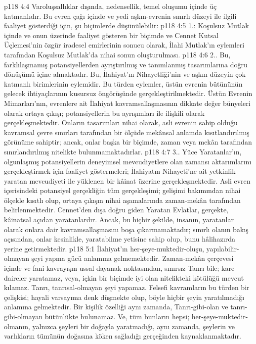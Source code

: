 \vs p118 4:4 Varoluşsallıklar dışında, nedensellik, temel oluşumu içinde üç katmanlıdır. Bu evren çağı içinde ve yedi aşkın\hyp{}evrenin sınırlı düzeyi ile ilgili faaliyet gösterdiği için, şu biçimlerde düşünülebilir:
\vs p118 4:5 1.\bibnobreakspace {}: Koşulsuz Mutlak içinde ve onun üzerinde faaliyet gösteren bir biçimde ve Cennet Kutsal Üçlemesi’nin özgür iradesel emirlerinin sonucu olarak, İlahi Mutlak’ın eylemleri tarafından Koşulsuz Mutlak’da nihai sonun oluşturulması.
\vs p118 4:6 2.\bibnobreakspace {}. Bu, farklılaşmamış potansiyellerden ayrıştırılmış ve tanımlanmış tasarımlarına doğru dönüşümü içine almaktadır. Bu, İlahiyat’ın Nihayetliği’nin ve aşkın düzeyin çok katmanlı birimlerinin eylemidir. Bu türden eylemler, üstün evrenin bütününün gelecek ihtiyaçlarının kusursuz öngörüşünde gerçekleştirilmektedir. Üstün Evrenin Mimarları’nın, evrenlere ait İlahiyat kavramsallaşmasının dikkate değer bünyeleri olarak ortaya çıkışı; potansiyellerin bu ayrışımları ile ilişkili olarak gerçekleşmektedir. Onların tasarımları nihai olarak, asli evrenin sahip olduğu kavramsal çevre sınırları tarafından bir ölçüde mekânsal anlamda kısıtlandırılmış görünüme sahiptir; ancak,  onlar başka bir biçimde, zaman veya mekân tarafından sınırlandırılmış nitelikte bulunmamaktadırlar.
\vs p118 4:7 3.\bibnobreakspace {}. Yüce Yaratanlar’ın, olgunlaşmış potansiyellerin deneyimsel mevcudiyetlere olan zamansı aktarımlarını gerçekleştirmek için faaliyet göstermeleri; İlahiyatın Nihayeti’ne ait yetkinlik\hyp{}yaratan mevcudiyeti ile yüklenen bir kâinat üzerine gerçekleşmektedir. Asli evren içerisindeki potansiyel gerçekliğin tüm gerçekleşimi; gelişimi bakımından nihai ölçekle kısıtlı olup, ortaya çıkışın nihai aşamalarında zaman\hyp{}mekân tarafından belirlenmektedir. Cennet’den dışa doğru giden Yaratan Evlatlar, gerçekte, kâinatsal açıdan  yaratanlardır. Ancak, bu hiçbir şekilde, insanın, yaratanlar olarak onlara dair kavramsallaşmasını boşa çıkarmamaktadır; sınırlı olanın bakış açısından, onlar kesinlikle, yaratabilme yetisine sahip olup, bunu hâlihazırda yerine getirmektedir.
\vs p118 5:1 İlahiyat’ın her\hyp{}şeye\hyp{}muktedir\hyp{}oluşu, yapılabilir\hyp{}olmayan şeyi yapma gücü anlamına gelmemektedir. Zaman\hyp{}mekân çerçevesi içinde ve fani kavrayışın ussal dayanak noktasından, sınırsız Tanrı bile; kare daireler yaratamaz, veya, içkin bir biçimde iyi olan nitelikteki kötülüğü mevcut kılamaz. Tanrı, tanrısal\hyp{}olmayan şeyi yapamaz. Felsefi kavramların bu türden bir çelişkisi; hayali varsayıma denk düşmekte olup, böyle hiçbir şeyin yaratılmadığı anlamına gelmektedir. Bir kişilik özelliği aynı zamanda, Tanrı\hyp{}gibi\hyp{}olan ve tanrı\hyp{}gibi\hyp{}olmayan bütünlükte bulunamaz. Ve, tüm bunların hepsi; her\hyp{}şeye\hyp{}muktedir\hyp{}olmanın, yalnızca şeyleri bir doğayla yaratmadığı, aynı zamanda, şeylerin ve varlıkların tümünün doğasına köken sağladığı gerçeğinden kaynaklanmaktadır.
